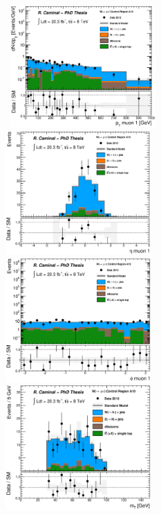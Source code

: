 \begin{figure}[!ht]
  \begin{center}
    \mbox{
      \includegraphics[width=0.495\textwidth]{Appendix_FluctuationM6/Figures/plot_Stop_A10_CRwmn_m_pt_fitted.eps}
      \includegraphics[width=0.495\textwidth]{Appendix_FluctuationM6/Figures/plot_Stop_A10_CRwmn_m_eta_fitted.eps}
    }
    \mbox{
      \includegraphics[width=0.495\textwidth]{Appendix_FluctuationM6/Figures/plot_Stop_A10_CRwmn_m_phi_fitted.eps}
      \includegraphics[width=0.495\textwidth]{Appendix_FluctuationM6/Figures/plot_Stop_A10_CRwmn_m_MT_fitted.eps}
}
\end{center}
\end{figure}
